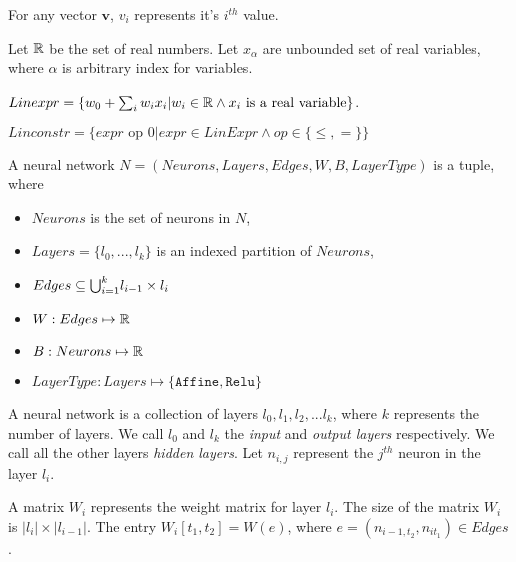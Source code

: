 For any vector $\boldsymbol{v}$, $v_i$ represents it's $i^{th}$ value.  

Let $\mathbb{R}$ be the set of real numbers.
Let $x_{\alpha}$ are unbounded set of real variables, where
$\alpha$ is arbitrary index for variables.

\begin{df}
    $Linexpr = \{ w_0 + \sum_{i} w_i x_i | w_i \in \mathbb{R} \land x_i \text{ is a real variable} \}$.
\end{df}
  
\begin{df}
    $Linconstr = \{expr \text{ op } 0 | expr \in LinExpr \land op \in \{\leq, = \}\}$
\end{df}

\begin{df}
    A neural network $N = (Neurons, Layers, Edges, W, B, LayerType)$ is a tuple, where
    \begin{itemize}
        \item $Neurons$ is the set of neurons in $N$,
        \item $Layers = \{l_0,...,l_k\}$ is an indexed partition of $Neurons$,
        \item $ Edges \subseteq {\bigcup}_{i=1}^{k} l_{i-1} \times l_{i}$
        \item $W : Edges \mapsto \mathbb{R}$
        \item $B : Neurons \mapsto \mathbb{R}$
        \item $LayerType : Layers \mapsto \{\mathtt{Affine}, \mathtt{Relu}\}$
    \end{itemize}
\end{df}

A neural network is a collection of layers $l_0, l_1, l_2, ... l_k$, where $k$ represents the number of layers.
We call $l_0$ and $l_k$ the {\em input} and {\em output layers} respectively.
We call all the other layers {\em hidden layers}.
Let $n_{i,j}$ represent the $j^{th}$ neuron in the layer $l_i$.
\begin{df}
    A matrix $W_i$ represents the weight matrix for layer $l_i$. The size of the matrix $W_i$ is $|l_i|\times |l_{i-1}|$. 
    The entry $W_i[t_1, t_2] = W(e)$, where $e = (n_{i-1,t_2}, n_{it_1}) \in Edges$.  
\end{df}


